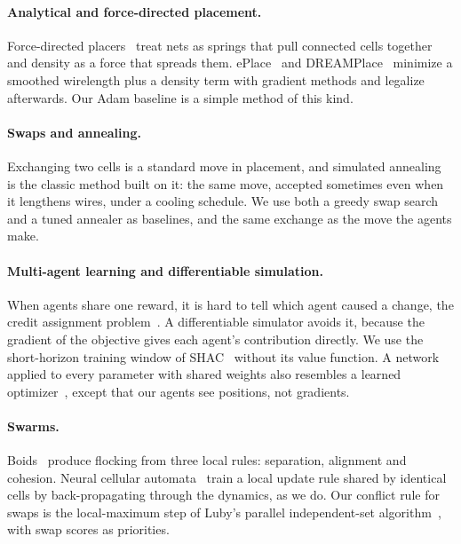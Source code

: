\documentclass[10pt]{article}
\begin{document}
\paragraph{Analytical and force-directed placement.} Force-directed placers~\citep{eisenmann1998generic,spindler2008kraftwerk2} treat nets as springs that pull connected cells together and density as a force that spreads them. ePlace~\citep{lu2015eplace} and DREAMPlace~\citep{lin2019dreamplace} minimize a smoothed wirelength plus a density term with gradient methods and legalize afterwards. Our Adam baseline is a simple method of this kind.

\paragraph{Swaps and annealing.} Exchanging two cells is a standard move in placement, and simulated annealing~\citep{sechen1985timberwolf} is the classic method built on it: the same move, accepted sometimes even when it lengthens wires, under a cooling schedule. We use both a greedy swap search and a tuned annealer as baselines, and the same exchange as the move the agents make.

\paragraph{Multi-agent learning and differentiable simulation.} When agents share one reward, it is hard to tell which agent caused a change, the credit assignment problem~\citep{foerster2018coma}. A differentiable simulator avoids it, because the gradient of the objective gives each agent's contribution directly. We use the short-horizon training window of SHAC~\citep{xu2022shac} without its value function. A network applied to every parameter with shared weights also resembles a learned optimizer~\citep{andrychowicz2016learning}, except that our agents see positions, not gradients.

\paragraph{Swarms.} Boids~\citep{reynolds1987flocks} produce flocking from three local rules: separation, alignment and cohesion. Neural cellular automata~\citep{mordvintsev2020growing} train a local update rule shared by identical cells by back-propagating through the dynamics, as we do. Our conflict rule for swaps is the local-maximum step of Luby's parallel independent-set algorithm~\citep{luby1986simple}, with swap scores as priorities.
\end{document}
